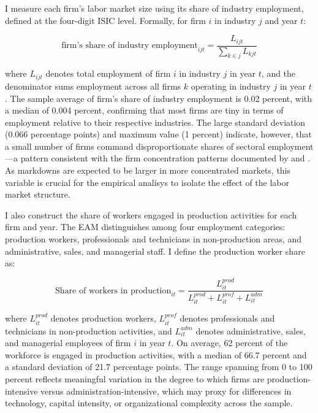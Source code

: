 \documentclass[12pt]{article}
\begin{document}
I measure each firm's labor market size using its share of industry employment, defined at the four-digit ISIC level. Formally, for firm $i$ in industry $j$ and year $t$:

\begin{equation}
    \text{firm's share of industry employment}_{ijt} = \frac{L_{ijt}}{\sum_{k \in j} L_{kjt}}
\end{equation}

where $L_{ijt}$ denotes total employment of firm $i$ in industry $j$ in year $t$, and the denominator sums employment across all firms $k$ operating in industry $j$ in year $t$. The sample average of firm's share of industry employment is 0.02 percent, with a median of 0.004 percent, confirming that most firms are tiny in terms of employment relative to their respective industries. The large standard deviation (0.066 percentage points) and maximum value (1 percent) indicate, however, that a small number of firms command disproportionate shares of sectoral employment—a pattern consistent with the firm concentration patterns documented by \textcite{alviarez_markets_2025} and \textcite{eslava_job_2022}. As markdowns are expected to be larger in more concentrated markets, this variable is crucial for the empirical analisys to isolate the effect of the labor market structure.

I also construct the share of workers engaged in production activities for each firm and year. The EAM distinguishes among four employment categories: production workers, professionals and technicians in non-production areas, and administrative, sales, and managerial staff. I define the production worker share as:

\begin{equation}
\text{Share of workers in production}_{it} = \frac{L^{prod}_{it}}{L^{prod}_{it} + L^{prof}_{it} + L^{adm}_{it}}
\label{eq:prod_share}
\end{equation}

where $L^{prod}_{it}$ denotes production workers, $L^{prof}_{it}$ denotes professionals and technicians in non-production activities, and $L^{adm}_{it}$ denotes administrative, sales, and managerial employees of firm $i$ in year $t$. On average, 62 percent of the workforce is engaged in production activities, with a median of 66.7 percent and a standard deviation of 21.7 percentage points. The range spanning from 0 to 100 percent reflects meaningful variation in the degree to which firms are production-intensive versus administration-intensive, which may proxy for differences in technology, capital intensity, or organizational complexity across the sample.
\end{document}
